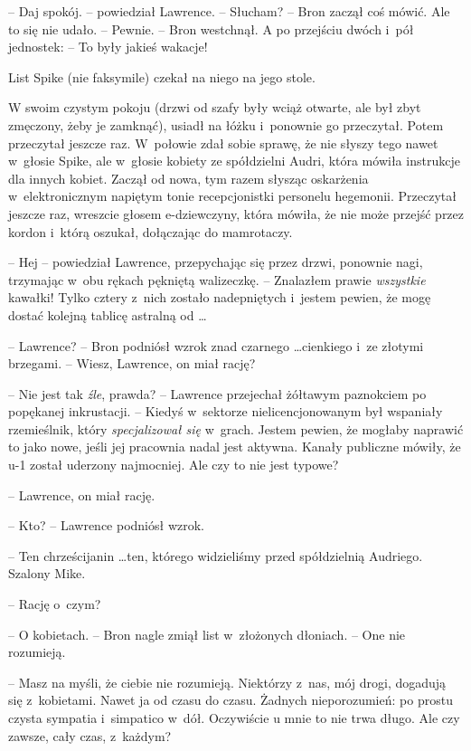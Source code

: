 \documentclass[oneside,polish,11pt,rmheadings]{mwbk}
\begin{document}
-- Daj spokój. -- powiedział Lawrence.  -- Słucham? -- Bron zaczął coś mówić. Ale to się nie udało. -- Pewnie. --  Bron westchnął. A po przejściu dwóch i~pół jednostek:  -- To były jakieś wakacje! 

List Spike (nie faksymile) czekał na niego na jego stole. 

W swoim czystym pokoju (drzwi od szafy były wciąż otwarte, ale był zbyt zmęczony, żeby je zamknąć), usiadł na łóżku i~ponownie go przeczytał. Potem przeczytał jeszcze raz. W~połowie zdał sobie sprawę, że nie słyszy tego nawet w~głosie Spike, ale w~głosie kobiety ze spółdzielni Audri, która mówiła instrukcje dla innych kobiet. Zaczął od nowa, tym razem słysząc oskarżenia w~elektronicznym napiętym tonie recepcjonistki personelu hegemonii. Przeczytał jeszcze raz, wreszcie głosem e-dziewczyny, która mówiła, że nie może przejść przez kordon i~którą oszukał, dołączając do mamrotaczy. 

-- Hej -- powiedział Lawrence, przepychając się przez drzwi, ponownie nagi, trzymając w~obu rękach pękniętą walizeczkę. -- Znalazłem prawie \textit{wszystkie }kawałki! Tylko cztery z~nich zostało nadepniętych i~jestem pewien, że mogę dostać kolejną tablicę astralną od \ldots  

-- Lawrence? -- Bron podniósł wzrok znad czarnego \ldots  cienkiego i~ze złotymi brzegami. -- Wiesz, Lawrence, on miał rację? 

-- Nie jest tak \textit{źle}, prawda? -- Lawrence przejechał żółtawym paznokciem po popękanej inkrustacji. -- Kiedyś w~sektorze nielicencjonowanym był wspaniały rzemieślnik, który \textit{specjalizował się} w~grach. Jestem pewien, że mogłaby naprawić to jako nowe, jeśli jej pracownia nadal jest aktywna. Kanały publiczne mówiły, że u-1 został uderzony najmocniej. Ale czy to nie jest typowe? 

-- Lawrence, on miał rację. 

-- Kto? --  Lawrence podniósł wzrok. 

-- Ten chrześcijanin \ldots  ten, którego widzieliśmy przed spółdzielnią Audriego. Szalony Mike. 

-- Rację o~czym? 

-- O kobietach. -- Bron nagle zmiął list w~złożonych dłoniach. -- One nie rozumieją. 

-- Masz na myśli, że ciebie nie rozumieją. Niektórzy z~nas, mój drogi, dogadują się z~kobietami. Nawet ja od czasu do czasu. Żadnych nieporozumień: po prostu czysta sympatia i~simpatico w~dół. Oczywiście u mnie to nie trwa długo. Ale czy zawsze, cały czas, z~każdym? 
\end{document}
